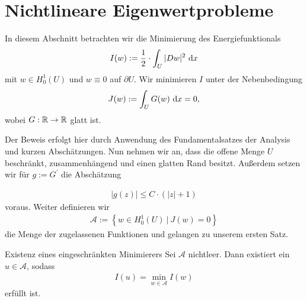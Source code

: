 \section{Nichtlineare Eigenwertprobleme}
In diesem Abschnitt betrachten wir die Minimierung des Energiefunktionals
\begin{equation}\label{equ:1.1}
I(w) := \frac{1}{2} \cdot \int_U |Dw|^2 \ \text{\rmfamily d} x
\end{equation}
mit $w \in H_0^1(U)$ und $w \equiv 0 $ auf $\partial U$.
Wir minimieren $I$ unter der Nebenbedingung
\begin{equation}\label{equ:1.2}
J(w) := \int_U G(w) \ \text{\rmfamily d} x = 0,
\end{equation}
wobei $G : \mathbb{R}  \to \mathbb{R}$ glatt ist.

Der Beweis erfolgt hier durch Anwendung des Fundamentalsatzes der Analysis und kurzen Abschätzungen.
Nun nehmen wir an, dass die offene Menge $U$ beschränkt, zusammenhängend und einen glatten Rand besitzt.
Außerdem setzen wir für $g := G^\prime$ die Abschätzung

\begin{align*}
|g(z)| \leq  C \cdot (|z| + 1 )
\end{align*}
voraus.
Weiter definieren wir 
\begin{align*}
\mathcal{A} := \left\lbrace w \in H_0^1(U) \ | \ J(w)=0 \right\rbrace
\end{align*}
die Menge der zugelassenen Funktionen und gelangen zu unserem ersten Satz.

\begin{genericthm}{Existenz eines eingeschränkten Minimierers}\label{skript:1.1}
Sei $\mathcal{A}$ nichtleer.
Dann existiert ein $u \in \mathcal{A}$, sodass
\begin{align*}
I(u) = \min \limits_{w \in \mathcal{A}} I(w)
\end{align*}
erfüllt ist.
\end{genericthm}

